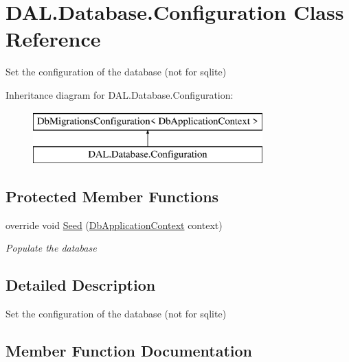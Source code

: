 \hypertarget{class_d_a_l_1_1_database_1_1_configuration}{}\section{D\+A\+L.\+Database.\+Configuration Class Reference}
\label{class_d_a_l_1_1_database_1_1_configuration}


Set the configuration of the database (not for sqlite)  


Inheritance diagram for D\+A\+L.\+Database.\+Configuration\+:\begin{figure}[H]
\begin{center}
\leavevmode
\includegraphics[height=2.000000cm]{class_d_a_l_1_1_database_1_1_configuration}
\end{center}
\end{figure}
\subsection*{Protected Member Functions}
\begin{DoxyCompactItemize}
\item 
override void \hyperlink{class_d_a_l_1_1_database_1_1_configuration_ab87c8987e23169c676d348d7433aaf21}{Seed} (\hyperlink{class_d_a_l_1_1_database_1_1_db_application_context}{Db\+Application\+Context} context)
\begin{DoxyCompactList}\small\item\em Populate the database \end{DoxyCompactList}\end{DoxyCompactItemize}


\subsection{Detailed Description}
Set the configuration of the database (not for sqlite) 



\subsection{Member Function Documentation}
\mbox{\label{class_d_a_l_1_1_database_1_1_configuration_ab87c8987e23169c676d348d7433aaf21}} 
